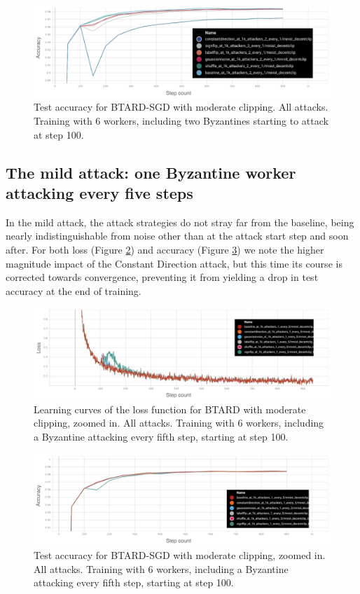\documentclass{article}
\begin{document}
\begin{figure}[h!]
\centering
\includegraphics[width=\textwidth]{figs/aggressive_attack_accuracy.jpeg}
\caption{Test accuracy for BTARD-SGD with moderate clipping. All attacks. Training with 6 workers, including two Byzantines starting to attack at step 100.}
\label{fig:test-acc}
\end{figure}

\subsection{The mild attack: one Byzantine worker attacking every five steps}
In the mild attack, the attack strategies do not stray far from the baseline, being nearly indistinguishable from noise other than at the attack start step and soon after. For both loss (Figure \ref{fig:learning-curve-mild}) and accuracy (Figure \ref{fig:test-acc-mild}) we note the higher magnitude impact of the Constant Direction attack, but this time its course is corrected towards convergence, preventing it from yielding a drop in test accuracy at the end of training.
\begin{figure}[h!]
\centering
\includegraphics[width=\textwidth]{figs/mild_attack_loss_zoomed_in.jpg}
\caption{Learning curves of the loss function for BTARD with moderate clipping, zoomed in. All attacks. Training with 6 workers, including a Byzantine attacking every fifth step, starting at step 100.}
\label{fig:learning-curve-mild}
\end{figure}

\begin{figure}[h!]
\centering
\includegraphics[width=\textwidth]{figs/mild_attack_accuracy.jpg}
\caption{Test accuracy for BTARD-SGD with moderate clipping, zoomed in. All attacks. Training with 6 workers, including a Byzantine attacking every fifth step, starting at step 100.}
\label{fig:test-acc-mild}
\end{figure}
\end{document}
